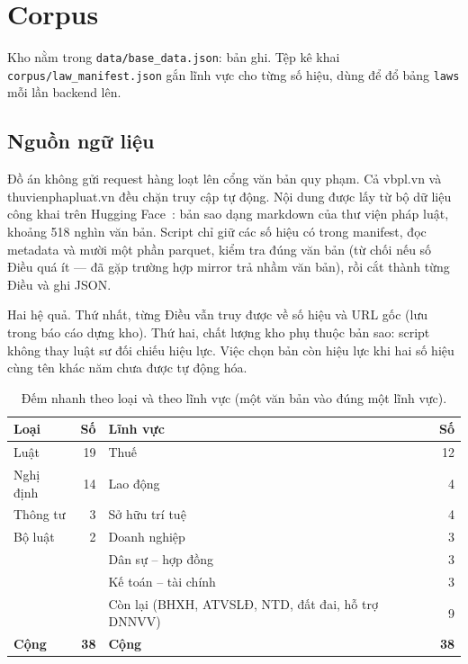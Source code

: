 \section{Corpus}

\label{sec:corpus}

Kho nằm trong \texttt{data/base\_data.json}: \soDieu{} bản ghi. Tệp kê khai
\texttt{corpus/law\_manifest.json} gắn lĩnh vực cho từng số hiệu, dùng để đổ
bảng \texttt{laws} mỗi lần backend lên.

\subsection{Nguồn ngữ liệu}

Đồ án không gửi request hàng loạt lên cổng văn bản quy phạm. Cả vbpl.vn và
thuvienphapluat.vn đều chặn truy cập tự động. Nội dung được lấy từ bộ dữ liệu
công khai  trên Hugging
Face~\cite{pdt590}: bản sao dạng markdown của thư viện pháp luật, khoảng 518
nghìn văn bản. Script  chỉ giữ các số hiệu có
trong manifest, đọc metadata và mười một phần parquet, kiểm tra đúng văn bản
(từ chối nếu số Điều quá ít --- đã gặp trường hợp mirror trả nhầm văn bản),
rồi cắt thành từng Điều và ghi JSON.

Hai hệ quả. Thứ nhất, từng Điều vẫn truy được về số hiệu và URL gốc (lưu trong
báo cáo dựng kho). Thứ hai, chất lượng kho phụ thuộc bản sao: script không thay
luật sư đối chiếu hiệu lực. Việc chọn bản còn hiệu lực khi hai số hiệu cùng tên
khác năm chưa được tự động hóa.

\begin{table}[htp]
\centering
\caption{Đếm nhanh theo loại và theo lĩnh vực (một văn bản vào đúng một lĩnh vực).}
\label{tab:corpus}
\begin{tabular}{p{3.4cm}r p{4.8cm}r}
\toprule
\textbf{Loại} & \textbf{Số} & \textbf{Lĩnh vực} & \textbf{Số} \\
\midrule
Luật & 19 & Thuế & 12 \\
Nghị định & 14 & Lao động & 4 \\
Thông tư & 3 & Sở hữu trí tuệ & 4 \\
Bộ luật & 2 & Doanh nghiệp & 3 \\
 &  & Dân sự -- hợp đồng & 3 \\
 &  & Kế toán -- tài chính & 3 \\
 &  & Còn lại (BHXH, ATVSLĐ, NTD, đất đai, hỗ trợ DNNVV) & 9 \\
\midrule
\textbf{Cộng} & \textbf{38} & \textbf{Cộng} & \textbf{38} \\
\bottomrule
\end{tabular}
\end{table}

